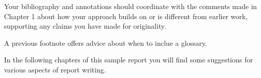 Your bibliography and annotations should coordinate with the comments made in Chapter 1 about how your approach builds on or is different from earlier work, supporting any claims you have made for originality. 
\vspace{5pt}

A previous footnote offers advice about when to inclue a glossary.

\vspace{20pt}
\noindent In the following chapters of this sample report you will find some suggestions for various aspects of report writing.

\endinput
